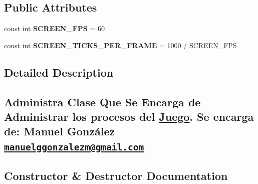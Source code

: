 \subsection*{Public Attributes}
\begin{DoxyCompactItemize}
\item 
const int {\bfseries S\+C\+R\+E\+E\+N\+\_\+\+F\+PS} = 60\hypertarget{class_game_manager_a91163b4a426dbd28df033202b9a333d9}{}\label{class_game_manager_a91163b4a426dbd28df033202b9a333d9}

\item 
const int {\bfseries S\+C\+R\+E\+E\+N\+\_\+\+T\+I\+C\+K\+S\+\_\+\+P\+E\+R\+\_\+\+F\+R\+A\+ME} = 1000 / S\+C\+R\+E\+E\+N\+\_\+\+F\+PS\hypertarget{class_game_manager_ab9207abff2a6da2815a218b7f31c4676}{}\label{class_game_manager_ab9207abff2a6da2815a218b7f31c4676}

\end{DoxyCompactItemize}


\subsection{Detailed Description}
\subsection*{Administra Clase Que Se Encarga de Administrar los procesos del \hyperlink{class_juego}{Juego}. Se encarga de\+:  Manuel González \href{mailto:manuelggonzalezm@gmail.com}{\tt manuelggonzalezm@gmail.\+com} }

\subsection{Constructor \& Destructor Documentation}
